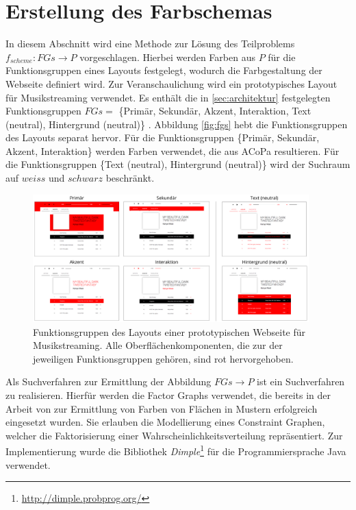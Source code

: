 \section{Erstellung des Farbschemas}
\label{sec:farbschema}

In diesem Abschnitt wird eine Methode zur Lösung des Teilproblems $f_{scheme}: FGs \to P$ vorgeschlagen. Hierbei werden Farben aus $P$ für die Funktionsgruppen eines Layouts festgelegt, wodurch die Farbgestaltung der Webseite definiert wird. Zur Veranschaulichung wird ein prototypisches Layout für Musikstreaming verwendet. Es enthält die in \autoref{sec:architektur} festgelegten Funktionsgruppen $FGs = $ \{Primär, Sekundär, Akzent, Interaktion, Text (neutral), Hintergrund (neutral)\} . Abbildung \autoref{fig:fgs} hebt die Funktionsgruppen des Layouts separat hervor. Für die Funktionsgruppen \{Primär, Sekundär, Akzent, Interaktion\} werden Farben verwendet, die aus ACoPa resultieren. Für die Funktionsgruppen \{Text (neutral), Hintergrund (neutral)\} wird der Suchraum auf $weiss$ und $schwarz$ beschränkt.

\begin{figure}[]
\centering
\includegraphics[width=0.95\textwidth]{img/fgs.png}
\caption{Funktionsgruppen des Layouts einer prototypischen Webseite für Musikstreaming. Alle Oberflächenkomponenten, die zur der jeweiligen Funktionsgruppen gehören, sind rot hervorgehoben.}
\label{fig:fgs}
\end{figure}

Als Suchverfahren zur Ermittlung der Abbildung $FGs \to P$ ist ein Suchverfahren zu realisieren. Hierfür werden die Factor Graphs verwendet, die bereits in der Arbeit von \citet{magazines} zur Ermittlung von Farben von Flächen in Mustern erfolgreich eingesetzt wurden. Sie erlauben die Modellierung eines Constraint Graphen, welcher die Faktorisierung einer Wahrscheinlichkeitsverteilung repräsentiert. Zur Implementierung wurde die Bibliothek \emph{Dimple}\footnote{\url{http://dimple.probprog.org/}} für die Programmiersprache Java verwendet.

